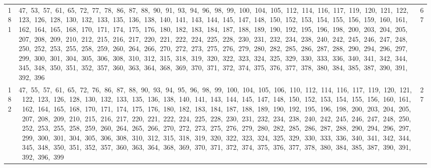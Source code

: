 \begin{longtable}{c|p{}|r}
181 & 47,\ 53,\ 57,\ 61,\ 65,\ 72,\ 77,\ 78,\ 86,\ 87,\ 88,\ 90,\ 91,\ 93,\ 94,\ 96,\ 98,\ 99,\ 100,\ 104,\ 105,\ 112,\ 114,\ 116,\ 117,\ 119,\ 120,\ 121,\ 122,\ 123,\ 126,\ 128,\ 130,\ 132,\ 133,\ 135,\ 136,\ 138,\ 140,\ 141,\ 143,\ 144,\ 145,\ 147,\ 148,\ 150,\ 152,\ 153,\ 154,\ 155,\ 156,\ 159,\ 160,\ 161,\ 162,\ 164,\ 165,\ 168,\ 170,\ 171,\ 174,\ 175,\ 176,\ 180,\ 182,\ 183,\ 184,\ 187,\ 188,\ 189,\ 190,\ 192,\ 195,\ 196,\ 198,\ 200,\ 203,\ 204,\ 205,\ 207,\ 208,\ 209,\ 210,\ 212,\ 215,\ 216,\ 217,\ 220,\ 221,\ 222,\ 224,\ 225,\ 228,\ 230,\ 231,\ 232,\ 234,\ 238,\ 240,\ 242,\ 245,\ 246,\ 247,\ 248,\ 250,\ 252,\ 253,\ 255,\ 258,\ 259,\ 260,\ 264,\ 266,\ 270,\ 272,\ 273,\ 275,\ 276,\ 279,\ 280,\ 282,\ 285,\ 286,\ 287,\ 288,\ 290,\ 294,\ 296,\ 297,\ 299,\ 300,\ 301,\ 304,\ 305,\ 306,\ 308,\ 310,\ 312,\ 315,\ 318,\ 319,\ 320,\ 322,\ 323,\ 324,\ 325,\ 329,\ 330,\ 333,\ 336,\ 340,\ 341,\ 342,\ 344,\ 345,\ 348,\ 350,\ 351,\ 352,\ 357,\ 360,\ 363,\ 364,\ 368,\ 369,\ 370,\ 371,\ 372,\ 374,\ 375,\ 376,\ 377,\ 378,\ 380,\ 384,\ 385,\ 387,\ 390,\ 391,\ 392,\ 396 & 67 \\
182 & 47,\ 55,\ 57,\ 61,\ 65,\ 72,\ 76,\ 86,\ 87,\ 88,\ 90,\ 93,\ 94,\ 95,\ 96,\ 98,\ 99,\ 100,\ 104,\ 105,\ 106,\ 110,\ 112,\ 114,\ 116,\ 117,\ 119,\ 120,\ 121,\ 122,\ 123,\ 126,\ 128,\ 130,\ 132,\ 133,\ 135,\ 136,\ 138,\ 140,\ 141,\ 143,\ 144,\ 145,\ 147,\ 148,\ 150,\ 152,\ 153,\ 154,\ 155,\ 156,\ 160,\ 161,\ 162,\ 164,\ 165,\ 168,\ 170,\ 171,\ 174,\ 175,\ 176,\ 180,\ 182,\ 183,\ 184,\ 187,\ 188,\ 189,\ 190,\ 192,\ 195,\ 196,\ 198,\ 200,\ 203,\ 204,\ 205,\ 207,\ 208,\ 209,\ 210,\ 215,\ 216,\ 217,\ 220,\ 221,\ 222,\ 224,\ 225,\ 228,\ 230,\ 231,\ 232,\ 234,\ 238,\ 240,\ 242,\ 245,\ 246,\ 247,\ 248,\ 250,\ 252,\ 253,\ 255,\ 258,\ 259,\ 260,\ 264,\ 265,\ 266,\ 270,\ 272,\ 273,\ 275,\ 276,\ 279,\ 280,\ 282,\ 285,\ 286,\ 287,\ 288,\ 290,\ 294,\ 296,\ 297,\ 299,\ 300,\ 301,\ 304,\ 305,\ 306,\ 308,\ 310,\ 312,\ 315,\ 318,\ 319,\ 320,\ 322,\ 323,\ 324,\ 325,\ 329,\ 330,\ 333,\ 336,\ 340,\ 341,\ 342,\ 344,\ 345,\ 348,\ 350,\ 351,\ 352,\ 357,\ 360,\ 363,\ 364,\ 368,\ 369,\ 370,\ 371,\ 372,\ 374,\ 375,\ 376,\ 377,\ 378,\ 380,\ 384,\ 385,\ 387,\ 390,\ 391,\ 392,\ 396,\ 399 & 27 \\

\end{longtable}
